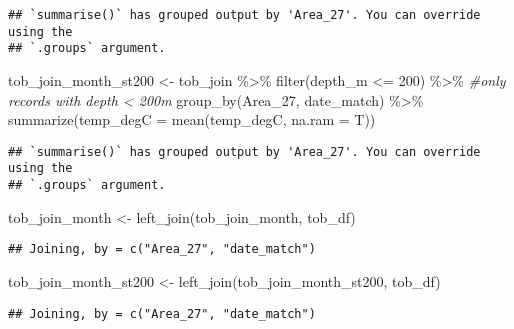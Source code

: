 \documentclass[
]{article}
\newenvironment{Shaded}{\begin{snugshade}}{\end{snugshade}}
\newcommand{\AttributeTok}[1]{\textcolor[rgb]{0.77,0.63,0.00}{#1}}
\newcommand{\CommentTok}[1]{\textcolor[rgb]{0.56,0.35,0.01}{\textit{#1}}}
\newcommand{\DecValTok}[1]{\textcolor[rgb]{0.00,0.00,0.81}{#1}}
\newcommand{\FunctionTok}[1]{\textcolor[rgb]{0.00,0.00,0.00}{#1}}
\newcommand{\NormalTok}[1]{#1}
\newcommand{\OtherTok}[1]{\textcolor[rgb]{0.56,0.35,0.01}{#1}}
\newcommand{\SpecialCharTok}[1]{\textcolor[rgb]{0.00,0.00,0.00}{#1}}
\begin{document}
\begin{verbatim}
## `summarise()` has grouped output by 'Area_27'. You can override using the
## `.groups` argument.
\end{verbatim}

\begin{Shaded}
\begin{Highlighting}[]
\NormalTok{tob\_join\_month\_st200 }\OtherTok{\textless{}{-}}\NormalTok{ tob\_join }\SpecialCharTok{\%\textgreater{}\%} 
  \FunctionTok{filter}\NormalTok{(depth\_m }\SpecialCharTok{\textless{}=} \DecValTok{200}\NormalTok{) }\SpecialCharTok{\%\textgreater{}\%} \CommentTok{\#only records with depth \textless{} 200m}
  \FunctionTok{group\_by}\NormalTok{(Area\_27, date\_match) }\SpecialCharTok{\%\textgreater{}\%} 
  \FunctionTok{summarize}\NormalTok{(}\AttributeTok{temp\_degC =} \FunctionTok{mean}\NormalTok{(temp\_degC, }\AttributeTok{na.ram =}\NormalTok{ T))}
\end{Highlighting}
\end{Shaded}

\begin{verbatim}
## `summarise()` has grouped output by 'Area_27'. You can override using the
## `.groups` argument.
\end{verbatim}

\begin{Shaded}
\begin{Highlighting}[]
\NormalTok{tob\_join\_month }\OtherTok{\textless{}{-}} \FunctionTok{left\_join}\NormalTok{(tob\_join\_month, tob\_df)}
\end{Highlighting}
\end{Shaded}

\begin{verbatim}
## Joining, by = c("Area_27", "date_match")
\end{verbatim}

\begin{Shaded}
\begin{Highlighting}[]
\NormalTok{tob\_join\_month\_st200 }\OtherTok{\textless{}{-}} \FunctionTok{left\_join}\NormalTok{(tob\_join\_month\_st200, tob\_df)}
\end{Highlighting}
\end{Shaded}

\begin{verbatim}
## Joining, by = c("Area_27", "date_match")
\end{verbatim}

\begin{Shaded}
\end{Shaded}
\end{document}
